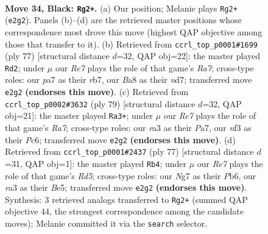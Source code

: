 \documentclass[11pt]{article}
\begin{document}
\clearpage

\begin{figure}[p]\centering
\begin{subfigure}{0.46\textwidth}\centering
\resizebox{\linewidth}{!}{%
\newchessgame
\chessboard[
  setfen={b4k2/P4pn1/6p1/4P3/6K1/R4N1P/4r3/3N4 b - - 4 34},
  showmover=false,
  pgfstyle=straightmove, color=movearrow, markmove={e2-g2}
]}
\caption{}
\end{subfigure}\hfill
\begin{subfigure}{0.46\textwidth}\centering
\resizebox{\linewidth}{!}{%
\newchessgame
\chessboard[
  setfen={8/1R1N1k2/5p2/3p2p1/3P4/6K1/r4PP1/3b4 b - - 1 39},
  showmover=false,
  pgfstyle=straightmove, color=movearrow, markmove={a2-d2}
]}
\caption{}
\end{subfigure}
\\[4pt]
\begin{subfigure}{0.46\textwidth}\centering
\resizebox{\linewidth}{!}{%
\newchessgame
\chessboard[
  setfen={8/p7/2p4k/2Pn3p/3N4/6KP/r5P1/3R4 b - - 3 40},
  showmover=false,
  pgfstyle=straightmove, color=movearrow, markmove={a2-a3}
]}
\caption{}
\end{subfigure}\hfill
\begin{subfigure}{0.46\textwidth}\centering
\resizebox{\linewidth}{!}{%
\newchessgame
\chessboard[
  setfen={6k1/1p5p/1p4p1/4b3/3rN3/1P5P/5PP1/4R1K1 b - - 3 39},
  showmover=false,
  pgfstyle=straightmove, color=movearrow, markmove={d4-b4}
]}
\caption{}
\end{subfigure}
\caption{\textbf{Move 34, Black: \texttt{Rg2+}.} (a) Our position; Melanie plays \texttt{Rg2+} (\texttt{e2g2}). Panels (b)--(d) are the retrieved master positions whose correspondence most drove this move (highest QAP objective among those that transfer to it). (b) Retrieved from \texttt{ccrl\_top\_p0001\#1699} (ply 77) [structural distance $d$=32, QAP obj=22]: the master played \texttt{Rd2}; under $\mu$ our \emph{Re7} plays the role of that game's \emph{Ra7}; cross-type roles: our \emph{p}a7 as their \emph{r}b7, our \emph{B}a8 as their \emph{n}d7; transferred move \texttt{e2g2} \textbf{(endorses this move)}. (c) Retrieved from \texttt{ccrl\_top\_p0002\#3632} (ply 79) [structural distance $d$=32, QAP obj=21]: the master played \texttt{Ra3+}; under $\mu$ our \emph{Re7} plays the role of that game's \emph{Ra7}; cross-type roles: our \emph{r}a3 as their \emph{P}a7, our \emph{n}f3 as their \emph{P}c6; transferred move \texttt{e2g2} \textbf{(endorses this move)}. (d) Retrieved from \texttt{ccrl\_top\_p0001\#2437} (ply 77) [structural distance $d$=31, QAP obj=1]: the master played \texttt{Rb4}; under $\mu$ our \emph{Re7} plays the role of that game's \emph{Rd5}; cross-type roles: our \emph{N}g7 as their \emph{P}b6, our \emph{r}a3 as their \emph{B}e5; transferred move \texttt{e2g2} \textbf{(endorses this move)}. Synthesis: 3 retrieved analogs transferred to \texttt{Rg2+} (summed QAP objective 44, the strongest correspondence among the candidate moves); Melanie committed it via the \texttt{search} selector.}
\label{fig:thought-m67}
\end{figure}
\end{document}
